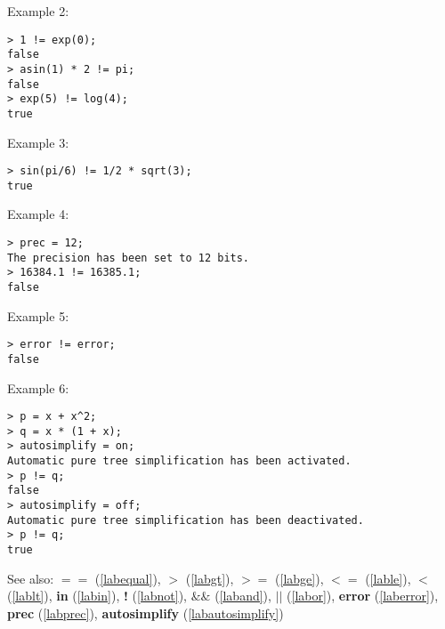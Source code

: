 \noindent Example 2: 
\begin{center}\begin{minipage}{15cm}\begin{Verbatim}[frame=single]
> 1 != exp(0);
false
> asin(1) * 2 != pi;
false
> exp(5) != log(4);
true
\end{Verbatim}
\end{minipage}\end{center}
\noindent Example 3: 
\begin{center}\begin{minipage}{15cm}\begin{Verbatim}[frame=single]
> sin(pi/6) != 1/2 * sqrt(3);
true
\end{Verbatim}
\end{minipage}\end{center}
\noindent Example 4: 
\begin{center}\begin{minipage}{15cm}\begin{Verbatim}[frame=single]
> prec = 12;
The precision has been set to 12 bits.
> 16384.1 != 16385.1;
false
\end{Verbatim}
\end{minipage}\end{center}
\noindent Example 5: 
\begin{center}\begin{minipage}{15cm}\begin{Verbatim}[frame=single]
> error != error;
false
\end{Verbatim}
\end{minipage}\end{center}
\noindent Example 6: 
\begin{center}\begin{minipage}{15cm}\begin{Verbatim}[frame=single]
> p = x + x^2;
> q = x * (1 + x);
> autosimplify = on;
Automatic pure tree simplification has been activated.
> p != q;
false
> autosimplify = off;
Automatic pure tree simplification has been deactivated.
> p != q;
true
\end{Verbatim}
\end{minipage}\end{center}
See also: \textbf{$==$} (\ref{labequal}), \textbf{$>$} (\ref{labgt}), \textbf{$>=$} (\ref{labge}), \textbf{$<=$} (\ref{lable}), \textbf{$<$} (\ref{lablt}), \textbf{in} (\ref{labin}), \textbf{!} (\ref{labnot}), \textbf{$\&\&$} (\ref{laband}), \textbf{$||$} (\ref{labor}), \textbf{error} (\ref{laberror}), \textbf{prec} (\ref{labprec}), \textbf{autosimplify} (\ref{labautosimplify})
